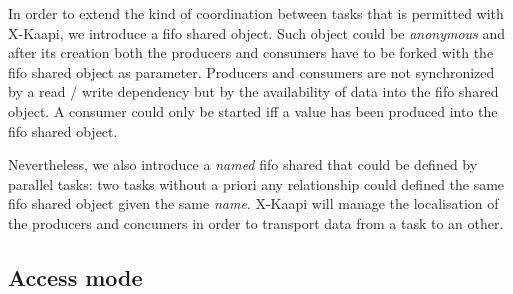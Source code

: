 \documentclass[12pt]{report}
\newcommand{\kaapi}{\textsc{X}-Kaapi\xspace}
\newcommand{\new}{}
\begin{document}
\new
In order to extend the kind of coordination between tasks that is permitted with \kaapi, we introduce a fifo shared object. Such object could be \textit{anonymous} and after its creation both the producers and consumers have to be forked with the fifo shared object as parameter. Producers and consumers are not synchronized by a read / write dependency but by the availability of data into the fifo shared object. A consumer could only be started iff a value has been produced into the fifo shared object.

Nevertheless, we also introduce a \textit{named} fifo shared that could be defined by parallel tasks: two tasks without a priori any relationship could defined the same fifo shared object given the same \textit{name}. \kaapi will manage the localisation of the producers and concumers in order to transport data from a task to an other.



\subsection{Access mode}
\end{document}
